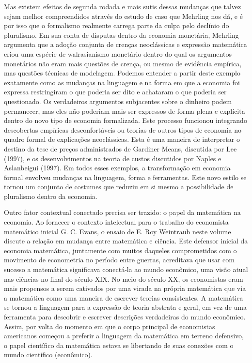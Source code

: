 \documentclass[12pt]{article}
\begin{document}
Mas existem efeitos de segunda rodada e mais sutis dessas mudanças que talvez sejam melhor compreendidos através do estudo de caso que Mehrling nos dá, e é por isso que o formalismo realmente carrega parte da culpa pelo declínio do pluralismo. Em sua conta de disputas dentro da economia monetária, Mehrling argumenta que a adoção conjunta de crenças neoclássicas e expressão matemática criou uma espécie de walrasianismo monetário dentro do qual os argumentos monetários não eram mais questões de crença, ou mesmo de evidência empírica, mas questões técnicas de modelagem. Podemos entender a partir deste exemplo exatamente como as mudanças na linguagem e na forma em que a economia foi expressa restringiram o que poderia ser dito e achataram o que poderia ser questionado. Os verdadeiros argumentos subjacentes sobre o dinheiro podem permanecer, mas eles não poderiam mais ser expressos de forma plena e explícita dentro do novo tipo de economia formalizada. Este processo funcionou integrando descobertas empíricas desconfortáveis ou teorias de outros tipos de economia no quadro formal de explicações neoclássicas. Esta é uma maneira de interpretar o destino da tese de preços administrados de Gardiner Means, discutida por Lee (1997), e os desenvolvimentos na teoria de custos discutidos por Naples e Aslanbeigui (1997). Em todos esses exemplos, a transformação em economia formal envolveu mudanças na linguagem, forma e ferramentas. Este novo estilo se tornou um conjunto de costumes que reduziu em si mesmo a possibilidade de pluralismo dentro da economia.

Outro fator contextual conectado precisa ser trazido: o papel da matemática na economia. Ao fornecer o contexto intelectual para o trabalho do economista matemático inicial G. C. Evans, o ensaio de E. Roy Weintraub neste volume discute a relação em mudança entre matemática e ciência. Este defensor inicial da economia matemática, juntamente com muitos daqueles comprometidos com o movimento de econometria no período entre guerras, acreditava que usar com sucesso a matemática significava conectá-la ao mundo econômico, uma visão atual nas ciências no final do século XIX. No meio do século XX, os economistas eram mais propensos a serem cativados por uma virada na própria matemática que via a matemática como uma maneira de escrever teorias consistentes. A matemática se tornou a linguagem para a expressão de teoria abstrata e geral, em vez de uma ferramenta para descobrir e escrever descrições verdadeiras do mundo econômico. Assim, por volta do momento em que o corpo principal de economistas americanos começou a preferir a linguagem da matemática em terreno defensivo, o papel científico da matemática estava se libertando de suas conexões com o mundo científico (econômico).
\end{document}
